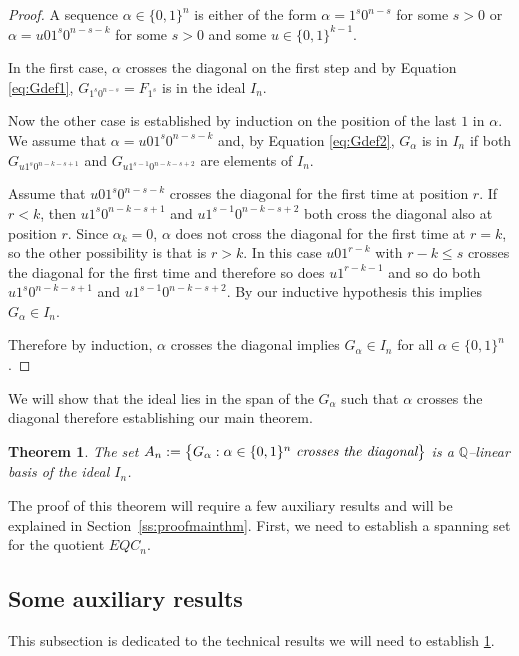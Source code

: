 \documentclass[11pt]{amsart}
\newtheorem{theorem}{Theorem}[section]
\theoremstyle{definition}
\numberwithin{equation}{section}
\begin{document}
\begin{proof}
A sequence $\alpha \in \{ 0, 1\}^n$ is either of the form
$\alpha = 1^s0^{n-s}$ for some $s > 0$ or
$\alpha = u01^s0^{n-s-k}$ for some $s>0$ and some $u \in \{0,1\}^{k-1}$.

In the first case, $\alpha$ crosses the diagonal on the first step and
by Equation \eqref{eq:Gdef1}, $G_{1^s0^{n-s}} = F_{1^s}$
is in the ideal $I_n$.

Now the other case is established by
induction on the position of the last $1$ in $\alpha$.
We assume that
$\alpha = u01^s0^{n-s-k}$ and, by Equation \eqref{eq:Gdef2},
$G_\alpha$ is in $I_n$ if both
$G_{u1^s0^{n-k-s+1}}$ and $G_{u1^{s-1}0^{n-k-s+2}}$
are elements of $I_n$.

Assume that $u01^s0^{n-s-k}$
crosses the diagonal for the first time at position $r$.
If $r<k$, then
$u1^s0^{n-k-s+1}$ and $u1^{s-1}0^{n-k-s+2}$
both cross the diagonal also at position $r$.
Since $\alpha_k=0$, $\alpha$ does not cross the diagonal for the first
time at $r=k$, so the other possibility is that is $r>k$.
In this case $u01^{r-k}$ with $r-k \leq s$ crosses the diagonal for the first time
and therefore so does $u1^{r-k-1}$ and so do both
$u1^s0^{n-k-s+1}$ and $u1^{s-1}0^{n-k-s+2}$.
By our inductive hypothesis this implies $G_\alpha \in I_n$.

Therefore by induction, $\alpha$ crosses the diagonal implies $G_\alpha \in I_n$
for all $\alpha \in \{0,1\}^n$.
\end{proof}

We will  show that the ideal lies in the span of the $G_\alpha$ such
that $\alpha$ crosses the diagonal therefore establishing our main theorem.

\begin{theorem}\label{thm:basisofideal}
The set $A_n:=\big\{ G_\alpha : \alpha \in \{0,1\}^n \text{ \it crosses the diagonal}\big\}$
is a $\mathbb Q$--linear basis of the ideal $I_n$.
\end{theorem}

The proof of this theorem will require a few auxiliary results and will be explained
in Section~\ref{ss:proofmainthm}.
First, we need to establish a spanning set for the quotient $EQC_n$.


\subsection{Some auxiliary results} This subsection is dedicated to the technical results we will need
to establish \ref{thm:basisofideal}.
\end{document}
